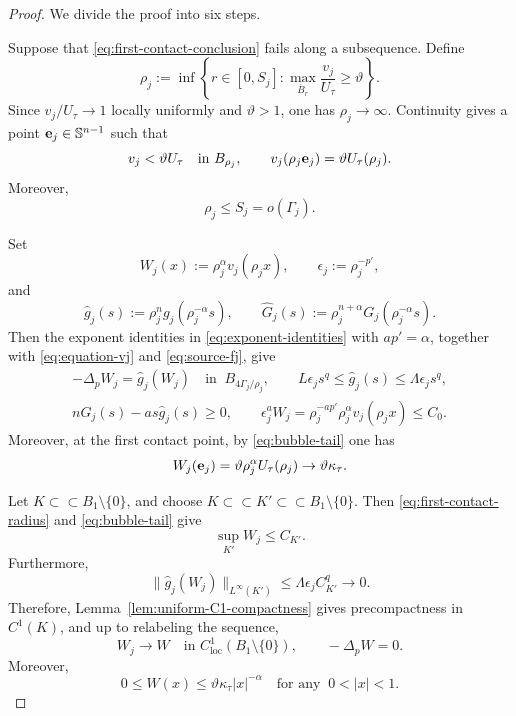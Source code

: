 \documentclass[reqno,12pt]{amsart}
\numberwithin{equation}{section}
\theoremstyle{remark}
\newcommand{\loc}{\mathrm{loc}}
\begin{document}
\begin{proof}
We divide the proof into six steps.

\medskip
{}
Suppose that \eqref{eq:first-contact-conclusion} fails along a
subsequence.  Define
$$\rho_j:=\inf\left\{ r\in[0,S_j]: \max_{\overline B_r}\frac{v_j}{U_\tau} \ge\vartheta \right\}.
$$
Since $v_j/U_\tau\to 1$ locally uniformly and $\vartheta>1$,
one has $\rho_j\to\infty$.  Continuity gives a point
${\bf e}_j\in\mathbb S^{n-1}$ such that
\begin{equation}\label{eq:first-contact-radius}
    v_j<\vartheta U_\tau\quad\text{in }B_{\rho_j},
\qquad v_j(\rho_j{\bf e}_j) =\vartheta U_\tau(\rho_j).
\end{equation}
Moreover,
$$
\rho_j\le S_j=o(\Gamma_j).
$$
 

Set
\begin{equation}\label{eq:defn-Wj}
W_j(x):=\rho_j^\alpha v_j(\rho_jx), \qquad \epsilon_j:=\rho_j^{-p'},
\end{equation}
and
\begin{equation}\label{eq:hat-fj}
\widehat g_j(s):=\rho_j^ng_j(\rho_j^{-\alpha}s),
\qquad \widehat G_j(s):=\rho_j^{n+\alpha}G_j(\rho_j^{-\alpha}s).
\end{equation}
Then the exponent identities in \eqref{eq:exponent-identities} with $ap'=\alpha$, together with \eqref{eq:equation-vj} and \eqref{eq:source-fj}, give
\begin{equation}\label{eq:blowdown-equation-bounds}
\begin{gathered}
-\Delta_pW_j=\widehat g_j(W_j)
\quad\text{in } \ B_{4\Gamma_j/\rho_j},\qquad 
L\epsilon_js^q\le\widehat g_j(s) \le \Lambda\epsilon_js^q,\\
  n\widehat G_j(s)-a s\widehat g_j(s)\ge0,
\qquad \epsilon_j^aW_j = \rho_j^{-ap'} \rho_j^\alpha v_j(\rho_jx)\le C_0.
\end{gathered}
\end{equation}
Moreover, at the first contact point, by \eqref{eq:bubble-tail} one has
\begin{equation}\label{eq:contact-value-limit}
W_j({\bf e}_j) =\vartheta\rho_j^\alpha U_\tau(\rho_j)
\to \vartheta\kappa_\tau.
\end{equation}

\medskip
{}
Let $K\subset\subset B_1\setminus\{0\}$, and choose
$K\subset\subset K'\subset \subset B_1\setminus\{0\}$.  Then \eqref{eq:first-contact-radius}  and \eqref{eq:bubble-tail} give
$$
\sup_{K'}W_j\le C_{K'}.
$$
Furthermore,
$$
\|\widehat g_j(W_j)\|_{L^\infty(K')}
\le\Lambda\epsilon_jC_{K'}^q\to 0.
$$
Therefore, Lemma~\ref{lem:uniform-C1-compactness}  gives precompactness in $C^1(K)$, and up to relabeling the sequence, 
\begin{equation}\label{eq:Wj-punctured-limit}
W_j\to W \quad\text{in }C^1_{\loc}(B_1\setminus\{0\}),
\qquad -\Delta_pW=0.
\end{equation}
Moreover,
\begin{equation}\label{eq:W-upper-pole}
0\le W(x)\le\vartheta\kappa_\tau|x|^{-\alpha}
\quad  \text{for any } \ 0<|x|<1.
\end{equation}


\end{proof}
\end{document}
